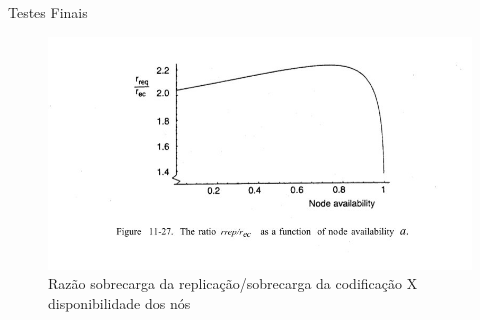   \begin{frame}{Testes Finais}

        \begin{figure}[hb]
     \centering
     \includegraphics[scale=0.3]{replicationXerasurecoding.jpg}
     \caption{Razão sobrecarga da replicação/sobrecarga da codificação X disponibilidade dos nós~\cite{Tanenbaum:2006}}
     \label{fig11:fb}
   \end{figure}

  \end{frame}
